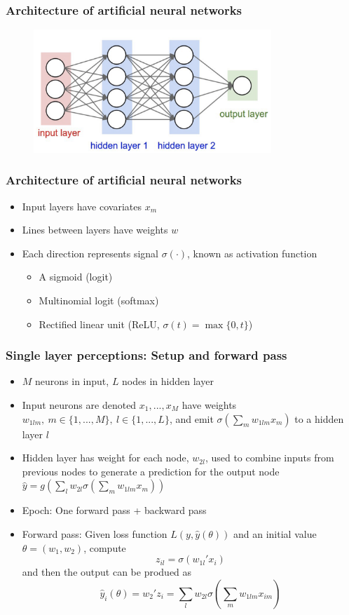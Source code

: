 \documentclass[aspectratio=169]{beamer}
\begin{document}
\begin{frame}
\frametitle{Architecture of artificial neural networks}
\begin{figure}[H]
\centering
\includegraphics[width=0.8\textwidth, keepaspectratio]{neuralnetwork.png}
\end{figure}
\end{frame}

\begin{frame}
\frametitle{Architecture of artificial neural networks}
\begin{itemize}
\item Input layers have covariates $x_m$
\item Lines between layers have weights $w$
\item Each direction represents signal $\sigma(\cdot)$, known as activation function
\begin{itemize}
\item A sigmoid (logit)
\item Multinomial logit (softmax)
\item Rectified linear unit (ReLU, $\sigma(t)=\max\{0,t\}$)
\end{itemize}
\end{itemize}
\end{frame}

\begin{frame}
\frametitle{Single layer perceptions: Setup and forward pass}
\begin{itemize}
\item $M$ neurons in input, $L$ nodes in hidden layer
\item Input neurons are denoted $x_1,...,x_M$ have weights $w_{1lm},\ m\in\{1,...,M\},\ l\in\{1,...,L\}$, and emit $\sigma(\sum_{m} w_{1lm}x_m)$ to a hidden layer $l$
\item Hidden layer has weight for each node, $w_{2l}$, used to combine inputs from previous nodes to generate a prediction for the output node $\hat{y} = g\left(\sum_l w_{2l}\sigma(\sum_{m} w_{1lm}x_m)\right)$
\item Epoch: One forward pass + backward pass
\item Forward pass:  Given loss function $L(y,\hat{y}(\theta))$ and an initial value $\theta=(w_1, w_2)$, compute
\[
z_{il}=\sigma(w_{1l}'x_i)
\]
and then the output can be produed as
\small{\[
\hat{y}_i(\theta) = w_2'z_i = \sum_l w_{2l}\sigma\left(\sum_{m} w_{1lm}x_{im}\right)
\] }\normalsize
\end{itemize}
\end{frame}
\end{document}
